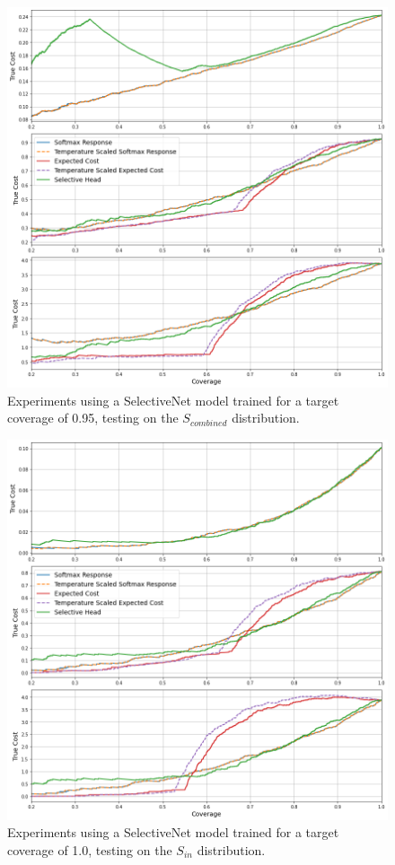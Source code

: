 \begin{figure}[H]
	\includegraphics[width=\textwidth]{images/binary/sn0.95_combine_distribution.png}
	\caption*{Experiments using a SelectiveNet model trained for a target coverage of 0.95, testing on the $S_{combined}$ distribution.}
\end{figure}

\begin{figure}[H]
	\includegraphics[width=\textwidth]{images/binary/sn1.0_in_distribution.png}
	\caption*{Experiments using a SelectiveNet model trained for a target coverage of 1.0, testing on the $S_{in}$ distribution.}
\end{figure}

